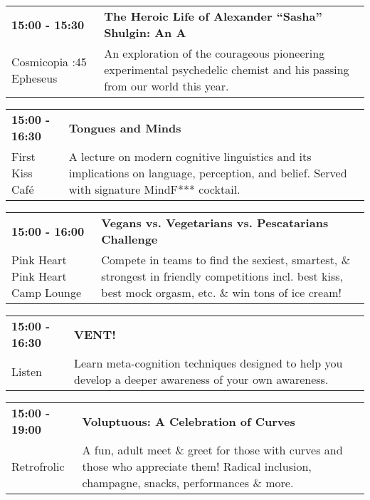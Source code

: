 \begin{tabular}{ p{1in} p{2.2in} }
    \textbf{15:00 - 15:30} & \textbf{The Heroic Life of Alexander ``Sasha'' Shulgin: An A} \\
    Cosmicopia \newline 3:45 Epheseus & An exploration of the courageous pioneering experimental psychedelic chemist and his passing from our world this year. \\
    \hline 
\end{tabular}
    
\begin{tabular}{ p{1in} p{2.2in} }
    \textbf{15:00 - 16:30} & \textbf{Tongues and Minds} \\
    First Kiss Caf\'e \newline  & A lecture on modern cognitive linguistics and its implications on language, perception, and belief. Served with signature MindF*** cocktail. \\
    \hline 
\end{tabular}
    
\begin{tabular}{ p{1in} p{2.2in} }
    \textbf{15:00 - 16:00} & \textbf{Vegans vs. Vegetarians vs. Pescatarians Challenge} \\
    Pink Heart \newline Pink Heart Camp Lounge & Compete in teams to find the sexiest, smartest, \& strongest in friendly competitions incl. best kiss, best mock orgasm, etc. \& win tons of ice cream! \\
    \hline 
\end{tabular}
    
\begin{tabular}{ p{1in} p{2.2in} }
    \textbf{15:00 - 16:30} & \textbf{VENT!} \\
    Listen \newline  & Learn meta-cognition techniques designed to help you develop a deeper awareness of your own awareness. \\
    \hline 
\end{tabular}
    
\begin{tabular}{ p{1in} p{2.2in} }
    \textbf{15:00 - 19:00} & \textbf{Voluptuous: A Celebration of Curves} \\
    Retrofrolic \newline  & A fun, adult meet \& greet for those with curves and those who appreciate them! Radical inclusion, champagne, snacks, performances \& more. \\
    \hline 
\end{tabular}
    
